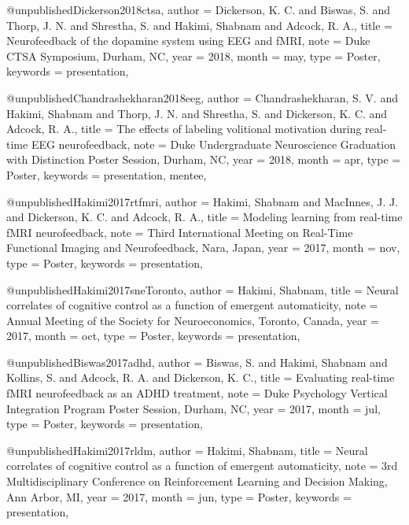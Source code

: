 @unpublished{Dickerson2018ctsa,
  author   = {Dickerson, K. C. and Biswas, S. and Thorp, J. N.
              and Shrestha, S. and Hakimi, Shabnam and Adcock, R. A.},
  title    = {Neurofeedback of the dopamine system using {EEG} and {fMRI}},
  note     = {Duke CTSA Symposium, Durham, NC},
  year     = {2018},
  month    = may,
  type     = {Poster},
  keywords = {presentation},
}

@unpublished{Chandrashekharan2018eeg,
  author   = {Chandrashekharan, S. V. and Hakimi, Shabnam
              and Thorp, J. N. and Shrestha, S.
              and Dickerson, K. C. and Adcock, R. A.},
  title    = {The effects of labeling volitional motivation during
              real-time {EEG} neurofeedback},
  note     = {Duke Undergraduate Neuroscience Graduation with Distinction
              Poster Session, Durham, NC},
  year     = {2018},
  month    = apr,
  type     = {Poster},
  keywords = {presentation, mentee},
}


@unpublished{Hakimi2017rtfmri,
  author   = {Hakimi, Shabnam and MacInnes, J. J. and Dickerson, K. C.
              and Adcock, R. A.},
  title    = {Modeling learning from real-time {fMRI} neurofeedback},
  note     = {Third International Meeting on Real-Time Functional Imaging
              and Neurofeedback, Nara, Japan},
  year     = {2017},
  month    = nov,
  type     = {Poster},
  keywords = {presentation},
}

@unpublished{Hakimi2017sneToronto,
  author   = {Hakimi, Shabnam},
  title    = {Neural correlates of cognitive control as a function of
              emergent automaticity},
  note     = {Annual Meeting of the Society for Neuroeconomics,
              Toronto, Canada},
  year     = {2017},
  month    = oct,
  type     = {Poster},
  keywords = {presentation},
}

@unpublished{Biswas2017adhd,
  author   = {Biswas, S. and Hakimi, Shabnam and Kollins, S.
              and Adcock, R. A. and Dickerson, K. C.},
  title    = {Evaluating real-time {fMRI} neurofeedback as an {ADHD}
              treatment},
  note     = {Duke Psychology Vertical Integration Program Poster Session,
              Durham, NC},
  year     = {2017},
  month    = jul,
  type     = {Poster},
  keywords = {presentation},
}

@unpublished{Hakimi2017rldm,
  author   = {Hakimi, Shabnam},
  title    = {Neural correlates of cognitive control as a function of
              emergent automaticity},
  note     = {3rd Multidisciplinary Conference on Reinforcement Learning
              and Decision Making, Ann Arbor, MI},
  year     = {2017},
  month    = jun,
  type     = {Poster},
  keywords = {presentation},
}

